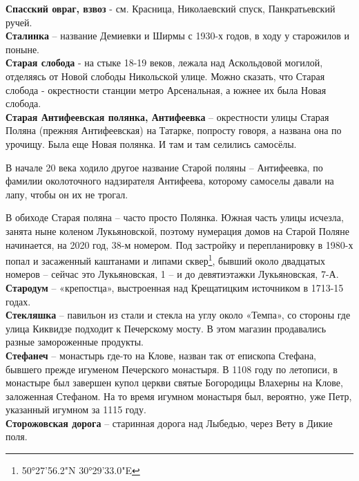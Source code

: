 \textbf{Спасский овраг, взвоз} - см. Красница, Николаевский спуск, Панкратьевский ручей.\\

\textbf{Сталинка} – название Демиевки и Ширмы с 1930-х годов, в ходу у старожилов и поныне.\\


\textbf{Старая слобода} - на стыке 18-19 веков, лежала над Аскольдовой могилой, отделяясь от Новой слободы Никольской улице. Можно сказать, что Старая слобода - окрестности станции метро Арсенальная, а южнее их была Новая слобода.\\

\textbf{Старая Антифеевская полянка, Антифеевка} – окрестности улицы Старая Поляна (прежняя Антифеевская) на Татарке, попросту говоря, а названа она по урочищу. Была еще Новая полянка. И там и там селились самосёлы. 

В начале 20 века ходило другое название Старой поляны – Антифеевка, по фамилии околоточного надзирателя Антифеева, которому самоселы давали на лапу, чтобы он их не трогал. 

В обиходе Старая поляна – часто просто Полянка. Южная часть улицы исчезла, занята ныне коленом Лукьяновской, поэтому нумерация домов на Старой Поляне начинается, на 2020 год, 38-м номером. Под застройку и перепланировку в 1980-х попал и засаженный каштанами и липами сквер\footnote{50°27'56.2"N 30°29'33.0"E}, бывший около двадцатых номеров – сейчас это Лукьяновская, 1 – и до девятиэтажки Лукьяновская, 7-А.\\

\textbf{Стародум} – «крепостца», выстроенная  над Крещатицким источником в 1713-15 годах.\\

\textbf{Стекляшка} – павильон из стали и стекла на углу около «Темпа», со стороны где улица Киквидзе подходит к Печерскому мосту. В этом магазин продавались разные замороженные продукты.\\

\textbf{Стефанеч} – монастырь где-то на Клове, назван так от епископа Стефана, бывшего прежде игуменом Печерского монастыря. В 1108 году по летописи, в монастыре был завершен купол церкви святые Богородицы Влахерны на Клове, заложенная Стефаном. На то время игумном монастыря был, вероятно, уже Петр, указанный игумном за 1115 году.\\

\textbf{Сторожовская дорога} – старинная дорога над Лыбедью, через Вету в Дикие поля.\\

